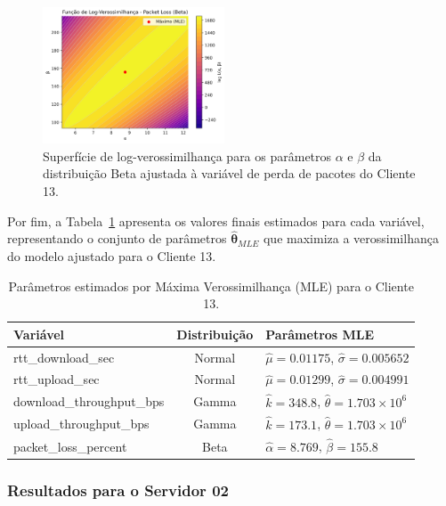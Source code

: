 \documentclass{article}
\begin{document}
\begin{figure}[htp]
	\centering
	\includegraphics[width=0.48\textwidth]{../figures/mle/packet_loss_loglik_surface_beta_client13.png}
	\caption{Superfície de log-verossimilhança para os parâmetros $\alpha$ e $\beta$ da distribuição Beta ajustada à variável de perda de pacotes do Cliente 13.}
	\label{fig:packet_loss_loglik_surface_beta_client13}
\end{figure}

Por fim, a Tabela~\ref{tab:mle_parameters_client13} apresenta os valores finais estimados para cada variável,
representando o conjunto de parâmetros $\hat{\boldsymbol{\theta}}_{MLE}$ que maximiza a verossimilhança
do modelo ajustado para o Cliente 13.

\begin{table}[htp]
	\centering
	\caption{Parâmetros estimados por Máxima Verossimilhança (MLE) para o Cliente 13.}
	\label{tab:mle_parameters_client13}
	\begin{tabular}{|l|c|l|}
		\hline
		\textbf{Variável} & \textbf{Distribuição} & \textbf{Parâmetros MLE}\\
		\hline
		rtt\_download\_sec & Normal & $\hat{\mu}=0.01175$, $\hat{\sigma}=0.005652$\\
		\hline
		rtt\_upload\_sec & Normal & $\hat{\mu}=0.01299$, $\hat{\sigma}=0.004991$\\
		\hline
		download\_throughput\_bps & Gamma & $\hat{k}=348.8$, $\hat{\theta}=1.703 \times 10^6$ \\
		\hline
		upload\_throughput\_bps & Gamma & $\hat{k}=173.1$, $\hat{\theta}=1.703 \times 10^6$ \\
		\hline
		packet\_loss\_percent & Beta & $\hat{\alpha}=8.769$, $\hat{\beta}=155.8$ \\
		\hline
	\end{tabular}
\end{table}

\subsubsection{Resultados para o Servidor 02}
\end{document}
